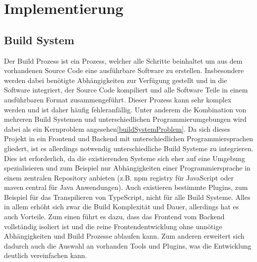 \chapter{Implementierung}

\section{Build System}
Der Build Prozess ist ein Prozess, welcher alle Schritte beinhaltet um aus dem vorhandenen Source Code eine ausführbare Software zu erstellen. Insbesondere werden dabei benötigte Abhängigkeiten zur Verfügung gestellt und in die Software integriert, der Source Code kompiliert und alle Software Teile in einem ausführbaren Format zusammengeführt. Dieser Prozess kann sehr komplex werden und ist daher häufig fehleranfällig. Unter anderem die Kombination von mehreren Build Systemen und unterschiedlichen Programmierumgebungen wird dabei als ein Kernproblem angesehen\ref{buildSystemProblem}. Da sich dieses Projekt in ein Frontend und Backend mit unterschiedlichen Programmiersprachen gliedert, ist es allerdings notwendig unterschiedliche Build Systeme zu integrieren. Dies ist erforderlich, da die existierenden Systeme sich eher auf eine Umgebung spezialisieren und zum Beispiel nur Abhängigkeiten einer Programmiersprache in einem zentralen Repository anbieten (z.B. npm registry für JavaScript oder maven central für Java Anwendungen). Auch existieren bestimmte Plugins, zum Beispiel für das Transpilieren von TypeScript, nicht für alle Build Systeme. Alles in allem erhöht sich zwar die Build Komplexität und Dauer, allerdings hat es auch Vorteile. Zum einen führt es dazu, dass das Frontend vom Backend vollständig isoliert ist und die reine Frontendentwicklung ohne unnötige Abhängigkeiten und Build Prozesse ablaufen kann. Zum anderen erweitert sich dadurch auch die Auswahl an vorhanden Tools und Plugins, was die Entwicklung deutlich vereinfachen kann.

